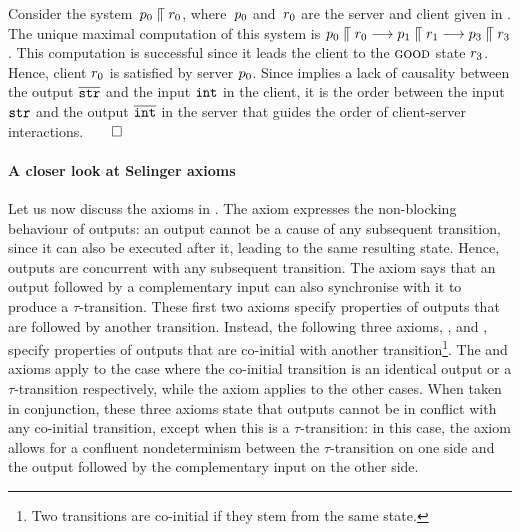 \begin{example}
\label{ex:max-comp}
 Consider the system~$p_0  \mathrel{\llceil}  r_0$, where~$p_0$
  and~$r_0$ are the server and client given in
  . The unique maximal computation of this system is
  $p_0  \mathrel{\llceil}  r_0 \mathrel{\overset{}\longrightarrow} p_1  \mathrel{\llceil}  r_1
  \mathrel{\overset{}\longrightarrow} p_3  \mathrel{\llceil}  r_3$.
This computation is successful since it leads the client to the $\textsc{good}$ state
$r_3$.
Hence, client  $r_0$ is
satisfied by server $p_0$.
%
Since \outputcommutativity implies a lack of causality
between the output $\overline{{\tt str}}$ and the input ${\tt int}$ in the
client, it is the order between the input ${\tt str}$ and the output
$\overline{\tt int}$ in the server that guides the order of client-server
interactions.\hfill$\qed$
\end{example}




\paragraph{A closer look at Selinger axioms}
Let us now discuss the axioms in .
The \outputcommutativity axiom expresses the non-blocking behaviour of
outputs: %
an output cannot be a cause of any subsequent transition, since it can
also be executed after it, leading to the same resulting state. Hence,
outputs are concurrent with any subsequent transition.  The
\outputfeedback axiom says that an output followed by a complementary
input can also synchronise with it to produce a $\tau$-transition.
These first
two axioms specify properties of outputs that are followed by another
transition. Instead, the following three axioms, \outputconfluence,
\outputdeterminacy and \outputtau, specify properties of outputs that
are co-initial with another transition\footnote{Two transitions are
  co-initial if they stem from the same state.}. The
\outputdeterminacy and \outputtau axioms apply to the case where the
co-initial transition is an identical output or a $\tau$-transition
respectively, while the \outputconfluence axiom applies to the other
cases.  When taken in conjunction, these three axioms state that outputs
cannot be in conflict %
with any co-initial transition, except when this is a
$\tau$-transition: in this case, the \outputtau axiom allows for a
confluent nondeterminism between the $\tau$-transition on one side and
the output followed by the complementary input on the other side.

